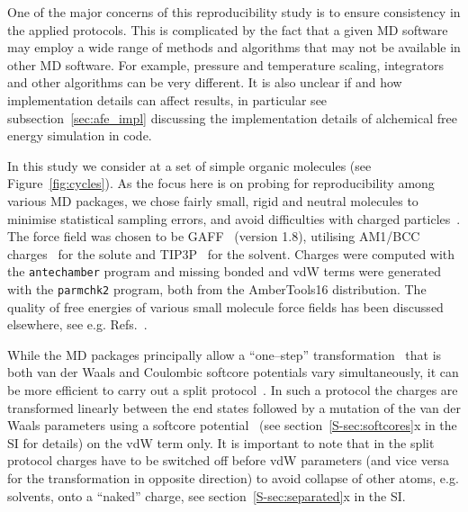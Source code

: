 \documentclass[journal=jctcce,manuscript=article]{achemso}
\newcommand{\progname}[1]{\texttt{#1}}
\begin{document}
One of the major concerns of this reproducibility study is to ensure
consistency in the applied protocols.  This is complicated by the fact
that a given MD software may employ a wide range of methods and algorithms that
may not be available in other MD software.  For example, pressure and
temperature scaling, integrators and other algorithms can be very
different.  It is also unclear if and how implementation details can
affect results, in particular see subsection~\ref{sec:afe_impl} discussing the 
implementation details of alchemical free energy simulation in code.

In this study we consider at a set of simple organic molecules (see
Figure~\ref{fig:cycles}).  As the focus here is on probing for
reproducibility among various MD packages, we chose fairly small,
rigid and neutral molecules to minimise statistical sampling errors, and
avoid difficulties with charged
particles~\cite{rocklin_calculating_2013, JCC:JCC1050}.  The force
field was chosen to be GAFF~\cite{wang_development_2004} (version
1.8), utilising AM1/BCC charges~\cite{jakalian_fast_2000,
  jakalian_fast_2002} for the solute and
TIP3P~\cite{jorgensen_comparison_1983-1} for the solvent.  Charges were 
computed with the \progname{antechamber} program and missing bonded and vdW 
terms were generated with the \progname{parmchk2} program, both from the 
AmberTools16 distribution.  The quality of free energies of various small 
molecule force fields has been discussed
elsewhere, see e.g. Refs.~.

While the MD packages principally allow a ``one--step'' 
transformation~\cite{steinbrecher_soft-core_2011}
that is both van der Waals and Coulombic softcore potentials vary
simultaneously, it can be more efficient to carry out a
split protocol~\cite{naden_linear_2014, naden_linear_2015}. 
In such a protocol the charges are transformed
linearly between the end states followed by a mutation of the van der
Waals parameters using a softcore
potential~\cite{beutler_avoiding_1994,
  zacharias_separationshifted_1994} (see section~\ref{S-sec:softcores}x in the 
  SI for details) on the vdW
term only.  It is important to note that in the split protocol
charges have to be switched off before vdW parameters (and vice versa
for the transformation in opposite direction) to avoid collapse of
other atoms, e.g. solvents, onto a ``naked'' charge, see 
section~\ref{S-sec:separated}x in the SI.
\end{document}
